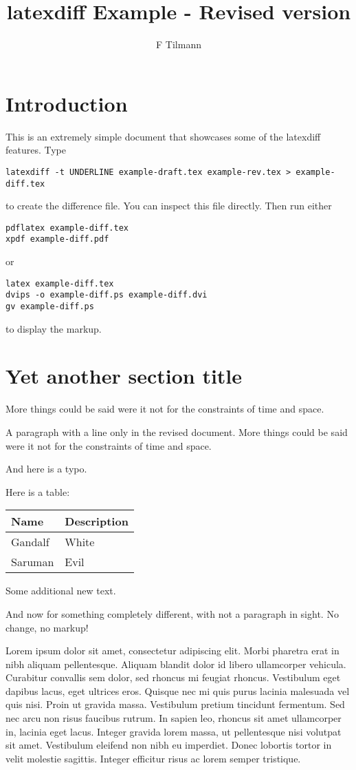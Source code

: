 \documentclass[12pt,a4paper]{article}
\title{latexdiff Example - Revised version}
\author{F Tilmann}
\begin{document}
\maketitle

\section*{Introduction}

This is an extremely simple document that showcases some of the latexdiff features.
Type
\begin{verbatim}
latexdiff -t UNDERLINE example-draft.tex example-rev.tex > example-diff.tex
\end{verbatim}
to create the difference file.  You can inspect this file directly. Then run either 
\begin{verbatim}
pdflatex example-diff.tex
xpdf example-diff.pdf
\end{verbatim}
or
\begin{verbatim}
latex example-diff.tex
dvips -o example-diff.ps example-diff.dvi
gv example-diff.ps
\end{verbatim}
to display the markup.

\section*{Yet another section title}

 More things could be said were it not for the constraints of time and space.

A paragraph with a line only in the revised document.  More things could be 
said were it not for the constraints of time and space.

And here is a typo. 

Here is a table:

\begin{tabular}{ll}
Name & Description \\
\hline
Gandalf & White \\
Saruman & Evil
\end{tabular}

Some additional new text.

And now for something completely different, with not a paragraph in sight.
No change, 
no markup!

Lorem ipsum dolor sit amet, consectetur adipiscing elit. Morbi pharetra erat in nibh aliquam pellentesque. Aliquam blandit dolor id libero ullamcorper vehicula. Curabitur convallis sem dolor, sed rhoncus mi feugiat rhoncus. Vestibulum eget dapibus lacus, %
eget ultrices eros. Quisque nec mi quis purus lacinia malesuada vel quis nisi. Proin ut gravida massa. Vestibulum pretium tincidunt fermentum. Sed nec arcu non risus faucibus rutrum. In sapien leo, rhoncus sit amet ullamcorper in, lacinia eget lacus. %
Integer gravida lorem massa, ut pellentesque nisi volutpat sit amet. Vestibulum eleifend non nibh eu imperdiet. Donec lobortis tortor in velit molestie sagittis. Integer efficitur risus ac lorem semper tristique. 
\end{document}
